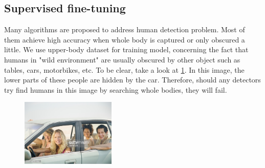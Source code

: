 \documentclass[conference]{IEEEtran}
\begin{document}
\subsection{Supervised fine-tuning}
Many algorithms are proposed to address human detection problem. Most of them achieve high accuracy when whole body is captured or only obscured a little. We use upper-body dataset for training model, concerning the fact that humans in "wild environment" are usually obscured by other object such as tables, cars, motorbikes, etc. To be clear, take a look at \ref{fig:h_exp1}. In this image, the lower parts of these people are hidden by the car. Therefore, should any detectors try find humans in this image by searching whole bodies, they will fail.
\begin{figure}
	\centering
	\includegraphics[width = 0.4\textwidth]{img7}
	\caption{}
	\label{fig:h_exp1}
\end{figure}
\end{document}
